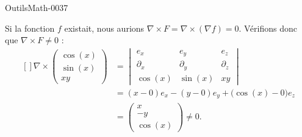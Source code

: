 
\begin{corrige}{OutilsMath-0037}

    Si la fonction $f$ existait, nous aurions $\nabla\times F=\nabla\times(\nabla f)=0$. Vérifions donc que $\nabla\times F\neq 0$ :
    \begin{equation}
        \begin{aligned}[]
            \nabla\times\begin{pmatrix}
                \cos(x)    \\ 
                \sin(x)    \\ 
                xy    
            \end{pmatrix}&=
            \begin{vmatrix}
                e_x    &   e_y    &   e_z    \\
                \partial_x    &   \partial_y    &    \partial_z    \\
                \cos(x)    &   \sin(x)    &   xy
            \end{vmatrix}\\
            &=(x-0)e_x-(y-0)e_y+\big( \cos(x)-0 \big)e_z\\
            &=\begin{pmatrix}
                x    \\ 
                -y    \\ 
                \cos(x)    
            \end{pmatrix}\neq 0.
        \end{aligned}
    \end{equation}
    
\end{corrige}
